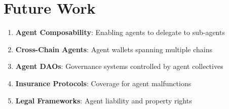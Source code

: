 \section{Future Work}


\begin{enumerate}
    \item \textbf{Agent Composability}: Enabling agents to delegate to sub-agents
    \item \textbf{Cross-Chain Agents}: Agent wallets spanning multiple chains
    \item \textbf{Agent DAOs}: Governance systems controlled by agent collectives
    \item \textbf{Insurance Protocols}: Coverage for agent malfunctions
    \item \textbf{Legal Frameworks}: Agent liability and property rights
\end{enumerate}

